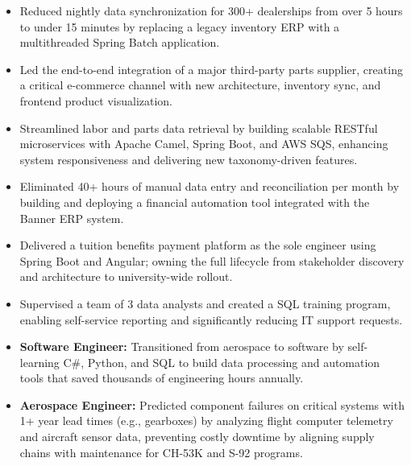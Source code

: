 \begin{itemize}[leftmargin=*, itemsep=\bulletItemSeparation, topsep=0pt]
    \item Reduced nightly data synchronization for 300+ dealerships from over 5 hours to under 15 minutes by replacing a legacy inventory ERP with a multithreaded Spring Batch application.
    \item Led the end-to-end integration of a major third-party parts supplier, creating a critical e-commerce channel with new architecture, inventory sync, and frontend product visualization.
    \item Streamlined labor and parts data retrieval by building scalable RESTful microservices with Apache Camel, Spring Boot, and AWS SQS, enhancing system responsiveness and delivering new taxonomy-driven features.
\end{itemize}
\vspace{\spacingBetweenJobs}

\begin{itemize}[leftmargin=*, itemsep=\bulletItemSeparation, topsep=0pt]
    \item Eliminated 40+ hours of manual data entry and reconciliation per month by building and deploying a financial automation tool integrated with the Banner ERP system.
    \item Delivered a tuition benefits payment platform as the sole engineer using Spring Boot and Angular; owning the full lifecycle from stakeholder discovery and architecture to university-wide rollout.
    \item Supervised a team of 3 data analysts and created a SQL training program, enabling self-service reporting and significantly reducing IT support requests.
\end{itemize}
\vspace{\spacingBetweenJobs}

\begin{itemize}[leftmargin=*, itemsep=\bulletItemSeparation, topsep=0pt]
    \item \textbf{Software Engineer:} Transitioned from aerospace to software by self-learning C\#, Python, and SQL to build data processing and automation tools that saved thousands of engineering hours annually.
    \item \textbf{Aerospace Engineer:} Predicted component failures on critical systems with 1+ year lead times (e.g., gearboxes) by analyzing flight computer telemetry and aircraft sensor data, preventing costly downtime by aligning supply chains with maintenance for CH-53K and S-92 programs.
\end{itemize}
\vspace{\spacingBetweenJobs}
\vspace{-1em}
